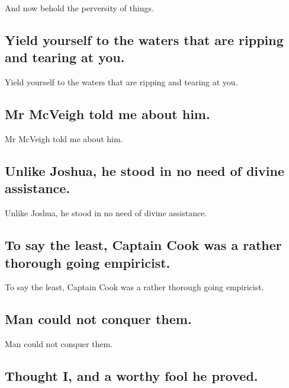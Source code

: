 \documentclass[]{article}
\begin{document}
And now behold the perversity of things.

\hypertarget{yield-yourself-to-the-waters-that-are-ripping-and-tearing-at-you.}{%
\subsection{Yield yourself to the waters that are ripping and tearing at
you.}\label{yield-yourself-to-the-waters-that-are-ripping-and-tearing-at-you.}}

Yield yourself to the waters that are ripping and tearing at you.

\hypertarget{mr-mcveigh-told-me-about-him.}{%
\subsection{Mr McVeigh told me about
him.}\label{mr-mcveigh-told-me-about-him.}}

Mr McVeigh told me about him.

\hypertarget{unlike-joshua-he-stood-in-no-need-of-divine-assistance.}{%
\subsection{Unlike Joshua, he stood in no need of divine
assistance.}\label{unlike-joshua-he-stood-in-no-need-of-divine-assistance.}}

Unlike Joshua, he stood in no need of divine assistance.

\hypertarget{to-say-the-least-captain-cook-was-a-rather-thorough-going-empiricist.}{%
\subsection{To say the least, Captain Cook was a rather thorough going
empiricist.}\label{to-say-the-least-captain-cook-was-a-rather-thorough-going-empiricist.}}

To say the least, Captain Cook was a rather thorough going empiricist.

\hypertarget{man-could-not-conquer-them.}{%
\subsection{Man could not conquer
them.}\label{man-could-not-conquer-them.}}

Man could not conquer them.

\hypertarget{thought-i-and-a-worthy-fool-he-proved.}{%
\subsection{Thought I, and a worthy fool he
proved.}\label{thought-i-and-a-worthy-fool-he-proved.}}
\end{document}

